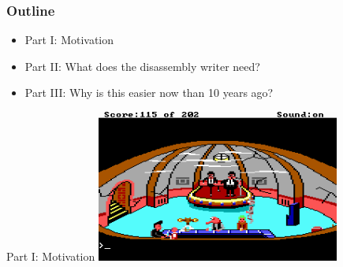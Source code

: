 \documentclass{beamer}
\begin{document}
\begin{frame}
  \frametitle{Outline}
    \begin{itemize}
      \item Part I: Motivation
      \item Part II: What does the disassembly writer need?
      \item Part III: Why is this easier now than 10 years ago?
    \end{itemize}
  \end{frame}

\begin{frame}{Part I: Motivation}
  \includegraphics[width=8cm]{sq1_blues_brothers}
\end{frame}
\end{document}
